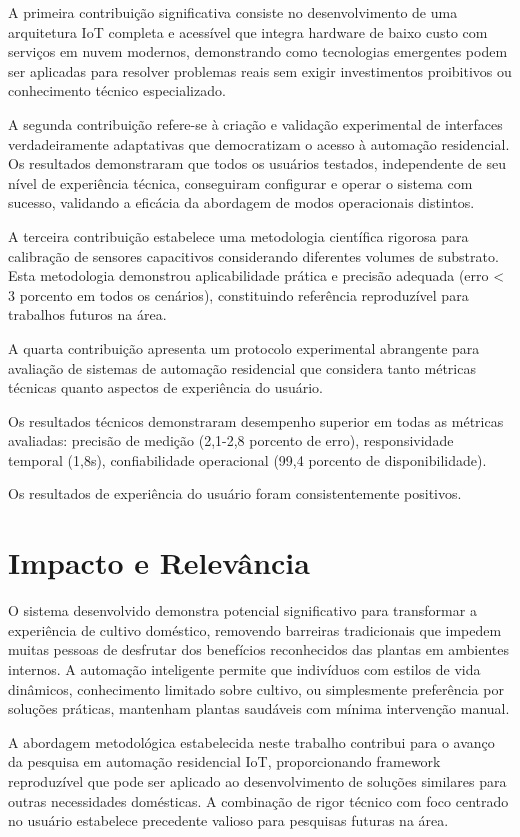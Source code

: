 \documentclass[oneside,english,brazilian]{UNISINOSmonografia}
\begin{document}
A primeira contribuição significativa consiste no desenvolvimento de uma arquitetura IoT completa e acessível que integra hardware de baixo custo com serviços em nuvem modernos, demonstrando como tecnologias emergentes podem ser aplicadas para resolver problemas reais sem exigir investimentos proibitivos ou conhecimento técnico especializado.

A segunda contribuição refere-se à criação e validação experimental de interfaces verdadeiramente adaptativas que democratizam o acesso à automação residencial. Os resultados demonstraram que todos os usuários testados, independente de seu nível de experiência técnica, conseguiram configurar e operar o sistema com sucesso, validando a eficácia da abordagem de modos operacionais distintos.

A terceira contribuição estabelece uma metodologia científica rigorosa para calibração de sensores capacitivos considerando diferentes volumes de substrato. Esta metodologia demonstrou aplicabilidade prática e precisão adequada (erro < 3 porcento em todos os cenários), constituindo referência reproduzível para trabalhos futuros na área.

A quarta contribuição apresenta um protocolo experimental abrangente para avaliação de sistemas de automação residencial que considera tanto métricas técnicas quanto aspectos de experiência do usuário.

Os resultados técnicos demonstraram desempenho superior em todas as métricas avaliadas: precisão de medição (2,1-2,8 porcento de erro), responsividade temporal (1,8s), confiabilidade operacional (99,4 porcento de disponibilidade).

Os resultados de experiência do usuário foram consistentemente positivos.

\section{Impacto e Relevância}

O sistema desenvolvido demonstra potencial significativo para transformar a experiência de cultivo doméstico, removendo barreiras tradicionais que impedem muitas pessoas de desfrutar dos benefícios reconhecidos das plantas em ambientes internos. A automação inteligente permite que indivíduos com estilos de vida dinâmicos, conhecimento limitado sobre cultivo, ou simplesmente preferência por soluções práticas, mantenham plantas saudáveis com mínima intervenção manual.

A abordagem metodológica estabelecida neste trabalho contribui para o avanço da pesquisa em automação residencial IoT, proporcionando framework reproduzível que pode ser aplicado ao desenvolvimento de soluções similares para outras necessidades domésticas. A combinação de rigor técnico com foco centrado no usuário estabelece precedente valioso para pesquisas futuras na área.
\end{document}
